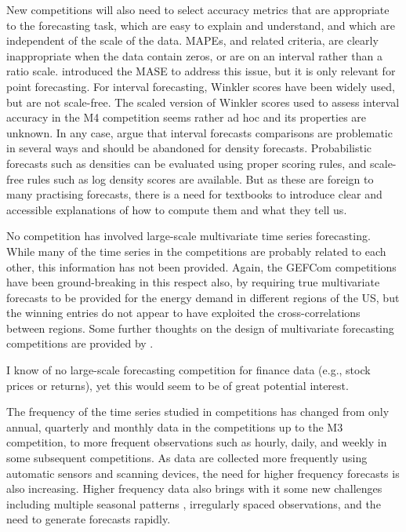 \documentclass[11pt,a4paper,]{article}
\begin{document}
New competitions will also need to select accuracy metrics that are appropriate to the forecasting task, which are easy to explain and understand, and which are independent of the scale of the data. MAPEs, and related criteria, are clearly inappropriate when the data contain zeros, or are on an interval rather than a ratio scale. \textcite{HK06} introduced the MASE to address this issue, but it is only relevant for point forecasting. For interval forecasting, Winkler scores \autocite{Winkler1972} have been widely used, but are not scale-free. The scaled version of Winkler scores used to assess interval accuracy in the M4 competition seems rather ad hoc and its properties are unknown. In any case, \textcite{Askanazi2018} argue that interval forecasts comparisons are problematic in several ways and should be abandoned for density forecasts. Probabilistic forecasts such as densities can be evaluated using proper scoring rules, and scale-free rules such as log density scores are available. But as these are foreign to many practising forecasts, there is a need for textbooks to introduce clear and accessible explanations of how to compute them and what they tell us.

No competition has involved large-scale multivariate time series forecasting. While many of the time series in the competitions are probably related to each other, this information has not been provided. Again, the GEFCom competitions have been ground-breaking in this respect also, by requiring true multivariate forecasts to be provided for the energy demand in different regions of the US, but the winning entries do not appear to have exploited the cross-correlations between regions. Some further thoughts on the design of multivariate forecasting competitions are provided by \textcite{FildesOrd2002}.

I know of no large-scale forecasting competition for finance data (e.g., stock prices or returns), yet this would seem to be of great potential interest.

The frequency of the time series studied in competitions has changed from only annual, quarterly and monthly data in the competitions up to the M3 competition, to more frequent observations such as hourly, daily, and weekly in some subsequent competitions. As data are collected more frequently using automatic sensors and scanning devices, the need for higher frequency forecasts is also increasing. Higher frequency data also brings with it some new challenges including multiple seasonal patterns \autocite{DHS11}, irregularly spaced observations, and the need to generate forecasts rapidly.
\end{document}
